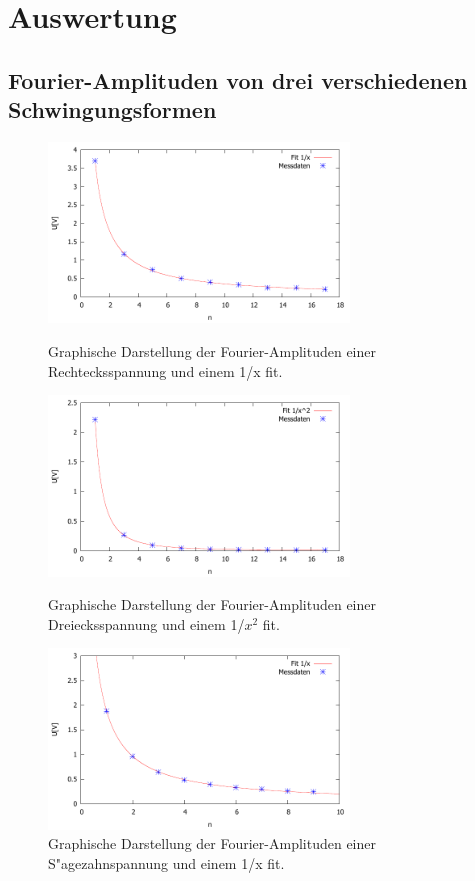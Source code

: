 \section{Auswertung}
\label{sec:auswertung}

\subsection{Fourier-Amplituden von drei verschiedenen Schwingungsformen} %
\label{sub:fourier_amplituden_von_drei_verschiedenen_}

\begin{figure}[!h]
	\centering
	\includegraphics[width = 8cm]{img/rechteck.pdf}
	\caption{Graphische Darstellung der Fourier-Amplituden einer Rechtecksspannung und einem 1/x fit.}
	\label{gra:recht}

	\includegraphics[width = 8cm]{img/dreieck.pdf}
	\caption{Graphische Darstellung der Fourier-Amplituden einer Dreiecksspannung und einem 1/$x^2$ fit.}
	\label{gra:dreieck}

	\includegraphics[width = 8cm]{img/saegezahn.pdf}
	\caption{Graphische Darstellung der Fourier-Amplituden einer S"agezahnspannung und einem 1/x fit.}
	\label{gra:saege}
\end{figure}

